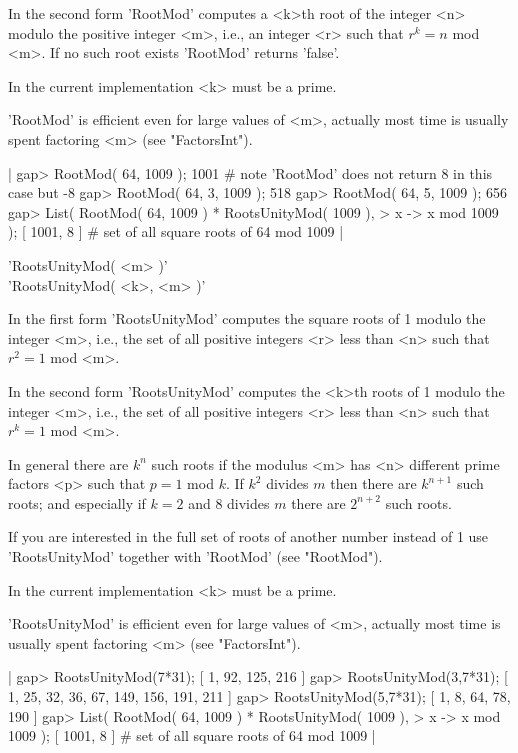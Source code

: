 In the  second form 'RootMod'  computes a <k>th  root of the  integer <n>
modulo the positive integer <m>, i.e., an integer <r> such that $r^k = n$
mod <m>.  If no such root exists 'RootMod' returns 'false'.

In the current implementation <k> must be a prime.

'RootMod' is efficient even for large values of <m>,  actually  most time
is usually spent factoring <m> (see "FactorsInt").

|    gap> RootMod( 64, 1009 );
    1001        # note 'RootMod' does not return 8 in this case but -8
    gap> RootMod( 64, 3, 1009 );
    518
    gap> RootMod( 64, 5, 1009 );
    656
    gap> List( RootMod( 64, 1009 ) * RootsUnityMod( 1009 ),
    >          x -> x mod 1009 );
    [ 1001, 8 ]        # set of all square roots of 64 mod 1009 |

%
%

'RootsUnityMod( <m> )' \\
'RootsUnityMod( <k>, <m> )'

In the first form 'RootsUnityMod' computes the square  roots of  1 modulo
the integer  <m>, i.e.,  the set of all positive  integers <r> less  than
<n> such that $r^2 = 1$ mod <m>.

In the second form 'RootsUnityMod'  computes the <k>th  roots of 1 modulo
the integer  <m>, i.e., the  set of  all positive integers <r>  less than
<n> such that $r^k = 1$ mod <m>.

In  general  there are  $k^n$ such  roots if  the  modulus  <m>  has  <n>
different prime factors <p> such that $p  = 1$ mod $k$.  If $k^2$ divides
$m$ then there are $k^{n+1}$ such roots; and especially if $k = 2$  and 8
divides $m$ there are $2^{n+2}$ such roots.

If you are interested in the full set of roots  of another number instead
of 1 use 'RootsUnityMod' together with 'RootMod' (see "RootMod").

In the current implementation <k> must be a prime.

'RootsUnityMod' is efficient even for large values  of <m>, actually most
time is usually spent factoring <m> (see "FactorsInt").

|    gap> RootsUnityMod(7*31);
    [ 1, 92, 125, 216 ]
    gap> RootsUnityMod(3,7*31);
    [ 1, 25, 32, 36, 67, 149, 156, 191, 211 ]
    gap> RootsUnityMod(5,7*31);
    [ 1, 8, 64, 78, 190 ]
    gap> List( RootMod( 64, 1009 ) * RootsUnityMod( 1009 ),
    >          x -> x mod 1009 );
    [ 1001, 8 ]        # set of all square roots of 64 mod 1009 |

